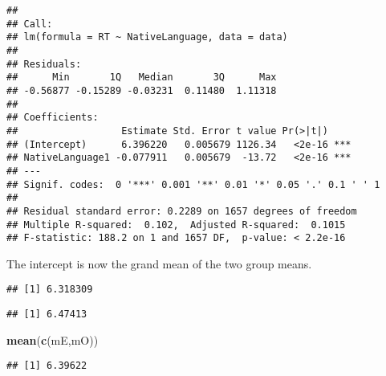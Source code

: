 \documentclass[
]{article}
\newenvironment{Shaded}{\begin{snugshade}}{\end{snugshade}}
\newcommand{\KeywordTok}[1]{\textcolor[rgb]{0.13,0.29,0.53}{\textbf{#1}}}
\newcommand{\NormalTok}[1]{#1}
\newcommand{\OperatorTok}[1]{\textcolor[rgb]{0.81,0.36,0.00}{\textbf{#1}}}
\newcommand{\StringTok}[1]{\textcolor[rgb]{0.31,0.60,0.02}{#1}}
\begin{document}
\begin{verbatim}
## 
## Call:
## lm(formula = RT ~ NativeLanguage, data = data)
## 
## Residuals:
##      Min       1Q   Median       3Q      Max 
## -0.56877 -0.15289 -0.03231  0.11480  1.11318 
## 
## Coefficients:
##                  Estimate Std. Error t value Pr(>|t|)    
## (Intercept)      6.396220   0.005679 1126.34   <2e-16 ***
## NativeLanguage1 -0.077911   0.005679  -13.72   <2e-16 ***
## ---
## Signif. codes:  0 '***' 0.001 '**' 0.01 '*' 0.05 '.' 0.1 ' ' 1
## 
## Residual standard error: 0.2289 on 1657 degrees of freedom
## Multiple R-squared:  0.102,  Adjusted R-squared:  0.1015 
## F-statistic: 188.2 on 1 and 1657 DF,  p-value: < 2.2e-16
\end{verbatim}

The intercept is now the grand mean of the two group means.

\begin{Shaded}
\end{Shaded}

\begin{verbatim}
## [1] 6.318309
\end{verbatim}

\begin{Shaded}
\end{Shaded}

\begin{verbatim}
## [1] 6.47413
\end{verbatim}

\begin{Shaded}
\begin{Highlighting}[]
\KeywordTok{mean}\NormalTok{(}\KeywordTok{c}\NormalTok{(mE,mO))}
\end{Highlighting}
\end{Shaded}

\begin{verbatim}
## [1] 6.39622
\end{verbatim}
\end{document}
